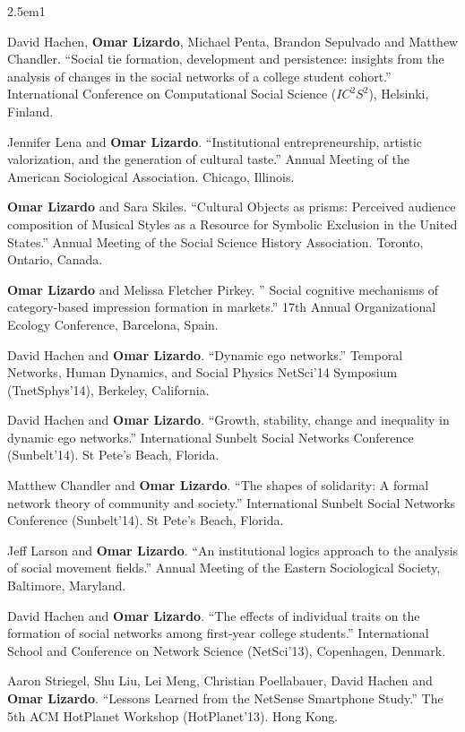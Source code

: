 \documentclass[
]{article}
\newenvironment{cventry}{\begin{hangparas}{2.5em}{1}}{\end{hangparas}}
\begin{document}
\begin{cventry}

David Hachen, \textbf{Omar Lizardo}, Michael Penta, Brandon Sepulvado
and Matthew Chandler. ``Social tie formation, development and
persistence: insights from the analysis of changes in the social
networks of a college student cohort.'' International Conference on
Computational Social Science (\(IC^2S^2\)), Helsinki, Finland.

Jennifer Lena and \textbf{Omar Lizardo}. ``Institutional
entrepreneurship, artistic valorization, and the generation of cultural
taste.'' Annual Meeting of the American Sociological Association.
Chicago, Illinois.

\textbf{Omar Lizardo} and Sara Skiles. ``Cultural Objects as prisms:
Perceived audience composition of Musical Styles as a Resource for
Symbolic Exclusion in the United States.'' Annual Meeting of the Social
Science History Association. Toronto, Ontario, Canada.

\textbf{Omar Lizardo} and Melissa Fletcher Pirkey. '' Social cognitive
mechanisms of category-based impression formation in markets.'' 17th
Annual Organizational Ecology Conference, Barcelona, Spain.

David Hachen and \textbf{Omar Lizardo}. ``Dynamic ego networks.''
Temporal Networks, Human Dynamics, and Social Physics NetSci'14
Symposium (TnetSphys'14), Berkeley, California.

David Hachen and \textbf{Omar Lizardo}. ``Growth, stability, change and
inequality in dynamic ego networks.'' International Sunbelt Social
Networks Conference (Sunbelt'14). St Pete's Beach, Florida.

Matthew Chandler and \textbf{Omar Lizardo}. ``The shapes of solidarity:
A formal network theory of community and society.'' International
Sunbelt Social Networks Conference (Sunbelt'14). St Pete's Beach,
Florida.

Jeff Larson and \textbf{Omar Lizardo}. ``An institutional logics
approach to the analysis of social movement fields.'' Annual Meeting of
the Eastern Sociological Society, Baltimore, Maryland.

David Hachen and \textbf{Omar Lizardo}. ``The effects of individual
traits on the formation of social networks among first-year college
students.'' International School and Conference on Network Science
(NetSci'13), Copenhagen, Denmark.

Aaron Striegel, Shu Liu, Lei Meng, Christian Poellabauer, David Hachen
and \textbf{Omar Lizardo}. ``Lessons Learned from the NetSense
Smartphone Study.'' The 5th ACM HotPlanet Workshop (HotPlanet'13). Hong
Kong.


\end{cventry}
\end{document}
